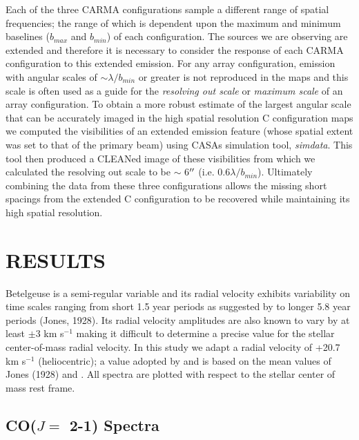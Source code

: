 \documentclass[iop]{emulateapj}
\begin{document}
Each of the three CARMA configurations sample a different range of spatial frequencies; the range of which is dependent upon the maximum and minimum baselines ($b_{max}$ and $b_{min}$) of each configuration. The sources we are observing are extended and therefore it is necessary to consider the response of each CARMA configuration to this extended emission. For any array configuration, emission with angular scales of $\sim \lambda/b_{min}$ or greater is not reproduced in the maps \citep{1999ASPC..180.....T} and this scale is often used as a guide for the \textit{resolving out scale} or \textit{maximum scale} of an array configuration. To obtain a more robust estimate of the largest angular scale that can be accurately imaged in the high spatial resolution C configuration maps we computed the visibilities of an extended emission feature (whose spatial extent was set to that of the primary beam) using CASAs simulation tool, \textit{simdata}. This tool then produced a CLEANed image of these visibilities from which we calculated the resolving out scale to be $\sim$ 6$\mbox{$^{\prime\prime}$}$ 
(i.e. $0.6\lambda/b_{min}$). Ultimately combining the data from these three configurations allows the missing short spacings from the extended C configuration to be recovered while maintaining its high spatial resolution.

\section{RESULTS} 

Betelgeuse is a  semi-regular variable and its radial velocity exhibits variability on time scales ranging from short 1.5 year periods as suggested by \cite{1931PWasO..15..178S} to longer 5.8 year periods (Jones, 1928). Its radial velocity amplitudes are also known to vary by at least $\pm$3 km s${}^{-1}$ \citep{1989AJ.....98.2233S} making it difficult to determine a precise value for the stellar center-of-mass radial velocity. In this study we adapt a radial velocity of +20.7 km s${}^{-1}$ (heliocentric); a value adopted by \citet{2008AJ....135.1430H} and is based on the mean values of Jones (1928) and \cite{1933CMWCI.464....1S}. All spectra are plotted with respect to the stellar center of mass rest frame.

\subsection{CO($J=$ 2-1) Spectra} \label{results1} %
\end{document}
